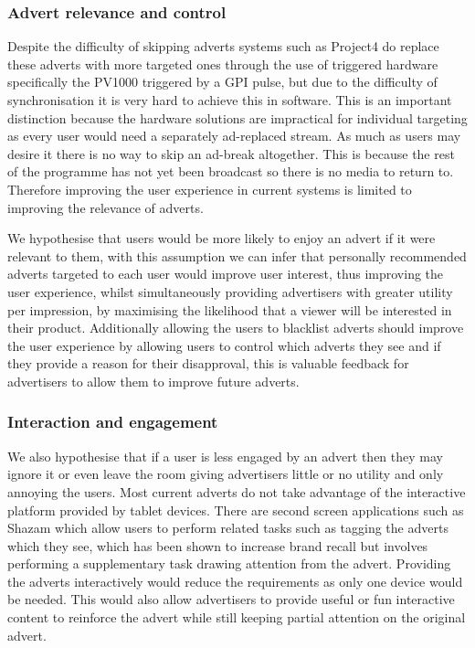 \subsubsection{Advert relevance and control}
	Despite the difficulty of skipping adverts systems such as Project4 do replace these adverts with more targeted ones through the use of triggered hardware specifically the PV1000 triggered by a GPI pulse, but due to the difficulty of synchronisation\cite{softwareTimeSync} it is very hard to achieve this in software. This is an important distinction because the hardware solutions are impractical for individual targeting as every user would need a separately ad-replaced stream. As much as users may desire it there is no way to skip an ad-break altogether. This is because the rest of the programme has not yet been broadcast so there is no media to return to. Therefore improving the user experience in current systems is limited to improving the relevance of adverts.

	We hypothesise that users would be more likely to enjoy an advert if it were relevant to them, with this assumption we can infer that personally recommended adverts targeted to each user would improve user interest, thus improving the user experience, whilst simultaneously providing advertisers with greater utility per impression, by maximising the likelihood that a viewer will be interested in their product. Additionally allowing the users to blacklist adverts should improve the user experience by allowing users to control which adverts they see and if they provide a reason for their disapproval, this is valuable feedback for advertisers to allow them to improve future adverts.

\subsubsection{Interaction and engagement}
	We also hypothesise that if a user is less engaged by an advert then they may ignore it or even leave the room giving advertisers little or no utility and only annoying the users. Most current adverts do not take advantage of the interactive platform provided by tablet devices. There are second screen applications such as Shazam\cite{shazam} which allow users to perform related tasks such as tagging the adverts which they see, which has been shown to increase brand recall but involves performing a supplementary task drawing attention from the advert. Providing the adverts interactively would reduce the requirements as only one device would be needed. This would also allow advertisers to provide useful or fun interactive content to reinforce the advert while still keeping partial attention on the original advert.

